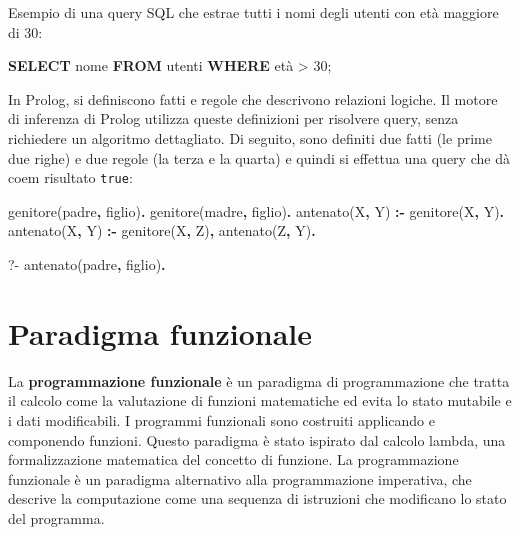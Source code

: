 \documentclass[
  letterpaper,
]{scrbook}
\newenvironment{Shaded}{\begin{snugshade}}{\end{snugshade}}
\newcommand{\DataTypeTok}[1]{\textcolor[rgb]{0.68,0.00,0.00}{#1}}
\newcommand{\DecValTok}[1]{\textcolor[rgb]{0.68,0.00,0.00}{#1}}
\newcommand{\FunctionTok}[1]{\textcolor[rgb]{0.28,0.35,0.67}{#1}}
\newcommand{\KeywordTok}[1]{\textcolor[rgb]{0.00,0.23,0.31}{\textbf{#1}}}
\newcommand{\NormalTok}[1]{\textcolor[rgb]{0.00,0.23,0.31}{#1}}
\newcommand{\OperatorTok}[1]{\textcolor[rgb]{0.37,0.37,0.37}{#1}}
\begin{document}
Esempio di una query SQL che estrae tutti i nomi degli utenti con età
maggiore di 30:

\begin{Shaded}
\begin{Highlighting}[]
\KeywordTok{SELECT}\NormalTok{ nome}
\KeywordTok{FROM}\NormalTok{ utenti}
\KeywordTok{WHERE}\NormalTok{ età }\OperatorTok{\textgreater{}} \DecValTok{30}\NormalTok{;}
\end{Highlighting}
\end{Shaded}

In Prolog, si definiscono fatti e regole che descrivono relazioni
logiche. Il motore di inferenza di Prolog utilizza queste definizioni
per risolvere query, senza richiedere un algoritmo dettagliato. Di
seguito, sono definiti due fatti (le prime due righe) e due regole (la
terza e la quarta) e quindi si effettua una query che dà coem risultato
\texttt{true}:

\begin{Shaded}
\begin{Highlighting}[]
\NormalTok{genitore(padre}\KeywordTok{,}\NormalTok{ figlio)}\KeywordTok{.}
\NormalTok{genitore(madre}\KeywordTok{,}\NormalTok{ figlio)}\KeywordTok{.}
\NormalTok{antenato(}\DataTypeTok{X}\KeywordTok{,} \DataTypeTok{Y}\NormalTok{) }\KeywordTok{:{-}}\NormalTok{ genitore(}\DataTypeTok{X}\KeywordTok{,} \DataTypeTok{Y}\NormalTok{)}\KeywordTok{.}
\NormalTok{antenato(}\DataTypeTok{X}\KeywordTok{,} \DataTypeTok{Y}\NormalTok{) }\KeywordTok{:{-}}\NormalTok{ genitore(}\DataTypeTok{X}\KeywordTok{,} \DataTypeTok{Z}\NormalTok{)}\KeywordTok{,}\NormalTok{ antenato(}\DataTypeTok{Z}\KeywordTok{,} \DataTypeTok{Y}\NormalTok{)}\KeywordTok{.}

\FunctionTok{?{-}}\NormalTok{ antenato(padre}\KeywordTok{,}\NormalTok{ figlio)}\KeywordTok{.}
\end{Highlighting}
\end{Shaded}

\section{Paradigma funzionale}\label{paradigma-funzionale}

La \textbf{programmazione funzionale} è un paradigma di programmazione
che tratta il calcolo come la valutazione di funzioni matematiche ed
evita lo stato mutabile e i dati modificabili. I programmi funzionali
sono costruiti applicando e componendo funzioni. Questo paradigma è
stato ispirato dal calcolo lambda, una formalizzazione matematica del
concetto di funzione. La programmazione funzionale è un paradigma
alternativo alla programmazione imperativa, che descrive la computazione
come una sequenza di istruzioni che modificano lo stato del programma.
\end{document}
